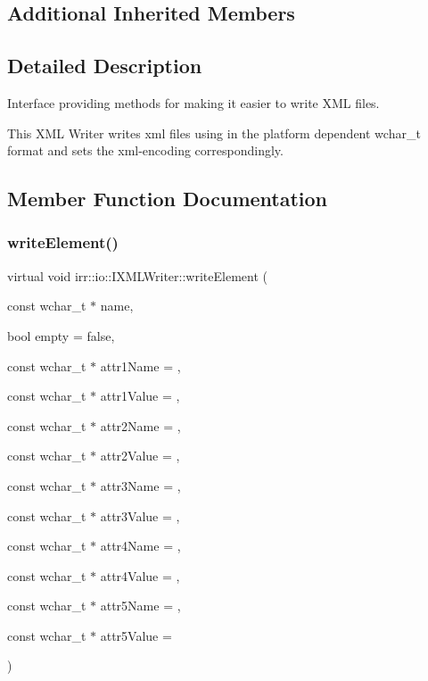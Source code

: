 \subsection*{Additional Inherited Members}


\subsection{Detailed Description}
Interface providing methods for making it easier to write X\+ML files. 

This X\+ML Writer writes xml files using in the platform dependent wchar\+\_\+t format and sets the xml-\/encoding correspondingly. 

\subsection{Member Function Documentation}
\mbox{\label{classirr_1_1io_1_1IXMLWriter_a09ffde58db20f23b7eba1bf08e1daf42}} 
\subsubsection{\texorpdfstring{write\+Element()}{writeElement()}\hspace{0.1cm}{\footnotesize\ttfamily [1/2]}}
{\footnotesize\ttfamily virtual void irr\+::io\+::\+I\+X\+M\+L\+Writer\+::write\+Element (\begin{DoxyParamCaption}\item[{const wchar\+\_\+t $\ast$}]{name,  }\item[{bool}]{empty = {\ttfamily false},  }\item[{const wchar\+\_\+t $\ast$}]{attr1\+Name = {},  }\item[{const wchar\+\_\+t $\ast$}]{attr1\+Value = {},  }\item[{const wchar\+\_\+t $\ast$}]{attr2\+Name = {},  }\item[{const wchar\+\_\+t $\ast$}]{attr2\+Value = {},  }\item[{const wchar\+\_\+t $\ast$}]{attr3\+Name = {},  }\item[{const wchar\+\_\+t $\ast$}]{attr3\+Value = {},  }\item[{const wchar\+\_\+t $\ast$}]{attr4\+Name = {},  }\item[{const wchar\+\_\+t $\ast$}]{attr4\+Value = {},  }\item[{const wchar\+\_\+t $\ast$}]{attr5\+Name = {},  }\item[{const wchar\+\_\+t $\ast$}]{attr5\+Value = {} }\end{DoxyParamCaption})\hspace{0.3cm}{\ttfamily [pure virtual]}}



